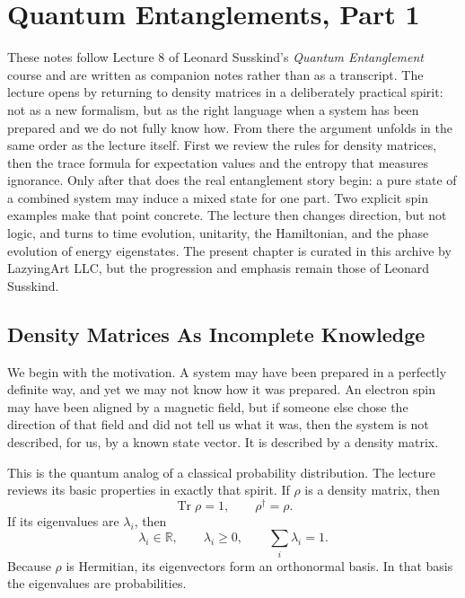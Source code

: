 \chapter{Quantum Entanglements, Part 1}

These notes follow Lecture 8 of Leonard Susskind's \emph{Quantum Entanglement} course and are written as companion notes rather than as a transcript. The lecture opens by returning to density matrices in a deliberately practical spirit: not as a new formalism, but as the right language when a system has been prepared and we do not fully know how. From there the argument unfolds in the same order as the lecture itself. First we review the rules for density matrices, then the trace formula for expectation values and the entropy that measures ignorance. Only after that does the real entanglement story begin: a pure state of a combined system may induce a mixed state for one part. Two explicit spin examples make that point concrete. The lecture then changes direction, but not logic, and turns to time evolution, unitarity, the Hamiltonian, and the phase evolution of energy eigenstates. The present chapter is curated in this archive by LazyingArt LLC, but the progression and emphasis remain those of Leonard Susskind.

\section{Density Matrices As Incomplete Knowledge}

We begin with the motivation. A system may have been prepared in a perfectly definite way, and yet we may not know how it was prepared. An electron spin may have been aligned by a magnetic field, but if someone else chose the direction of that field and did not tell us what it was, then the system is not described, for us, by a known state vector. It is described by a density matrix.

This is the quantum analog of a classical probability distribution. The lecture reviews its basic properties in exactly that spirit. If \(\rho\) is a density matrix, then
\begin{equation}
\operatorname{Tr}\rho = 1,
\qquad
\rho^\dagger = \rho.
\end{equation}
If its eigenvalues are \(\lambda_i\), then
\begin{equation}
\lambda_i \in \mathbb{R},
\qquad
\lambda_i \geq 0,
\qquad
\sum_i \lambda_i = 1.
\end{equation}
Because \(\rho\) is Hermitian, its eigenvectors form an orthonormal basis. In that basis the eigenvalues are probabilities.

